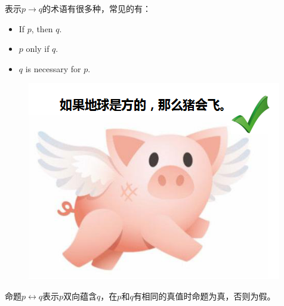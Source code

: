 \begin{table}[H]
    \centering
    \caption{蕴含真值表}
\end{table}

表示$ p \rightarrow q $的术语有很多种，常见的有：

\begin{itemize}
    \item If $ p $, then $ q $.
    \item $ p $ only if $ q $.
    \item $ q $ is necessary for $ p $.
\end{itemize}

\begin{figure}[H]
    \centering
    \includegraphics[scale=0.7]{img/Chapter4/4-1/1.png}
\end{figure}

命题$ p \leftrightarrow q $表示$ p $双向蕴含$ q $，在$ p $和$ q $有相同的真值时命题为真，否则为假。


